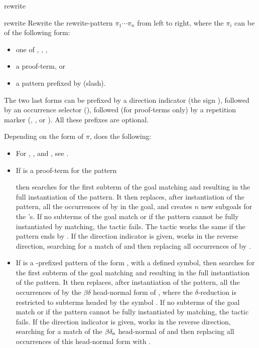 \begin{tactic}{rewrite}
  \begin{tsyntax}[empty]{rewrite}
  Rewrite the rewrite-pattern $\pi_1 \cdots \pi_n$ from left to right,
  where the $\pi_i$ can be of the following form:
  \begin{itemize}
  \item one of \ec{//}, \ec{/=}, \ec{//=},
  \item a proof-term, or
  \item a pattern prefixed by \ec{/} (slash).
  \end{itemize}
  The two last forms can be prefixed by a direction indicator (the sign
  \ec{-}), followed by an occurrence selector (),
  followed (for proof-terms only) by a repetition marker
  (\ec{!}, ,  or ). All these prefixes are optional.

  Depending on the form of $\pi$,  does the following:
    \begin{itemize}
    \item For \ec{//}, \ec{/=}, and \ec{//=}, see .
    \item If  is a proof-term for the pattern
      \begin{center}
      \end{center}
      \noindent then  searches for the first subterm of the goal
      matching  and resulting in the full instantiation of the pattern.
      It then replaces, after instantiation of the pattern, all the occurrences
      of  by  in the goal, and creates $n$ new subgoals for the
      's. If no subterms of the goal match  or if the pattern
      cannot be fully instantiated by matching, the tactic fails.
      The tactic works the same if the pattern ends by . If the
      direction indicator \ec{-} is given,  works in the reverse
      direction, searching for a match of  and then replacing all
      occurrences of  by .
    \item If  is a \ec{/}-prefixed pattern of the form ,
      with  a defined symbol, then  searches for the first subterm
      of the goal matching  and resulting in the full instantiation
      of the pattern. It then replaces, after instantiation of the pattern, all
      the occurrences of  by the $\beta\delta$ head-normal form
      of , where the $\delta$-reduction is restricted to subterms
      headed by the symbol . If no subterms of the goal match  or
      if the pattern cannot be fully instantiated by matching, the tactic fails. If the
      direction indicator \ec{-} is given,  works in the reverse
      direction, searching for a match of the $\beta\delta_{\rm o}$ head-normal
      of  and then replacing all occurrences of this head-normal
      form with .
    \end{itemize}
    

\end{tsyntax}
\end{tactic}

